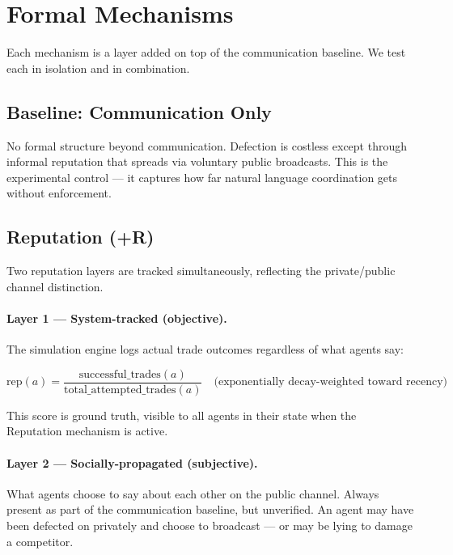 \documentclass[12pt, a4paper]{article}
\begin{document}
\section{Formal Mechanisms}
\label{sec:mechanisms}

Each mechanism is a layer added on top of the communication baseline. We test each in isolation and in combination.

\subsection{Baseline: Communication Only}

No formal structure beyond communication. Defection is costless except through informal reputation that spreads via voluntary public broadcasts. This is the experimental control — it captures how far natural language coordination gets without enforcement.

\subsection{Reputation (+R)}

Two reputation layers are tracked simultaneously, reflecting the private/public channel distinction.

\paragraph{Layer 1 — System-tracked (objective).}

The simulation engine logs actual trade outcomes regardless of what agents say:

\[
\text{rep}(a) = \frac{\text{successful\_trades}(a)}{\text{total\_attempted\_trades}(a)} \quad \text{(exponentially decay-weighted toward recency)}
\]

This score is ground truth, visible to all agents in their state when the Reputation mechanism is active.

\paragraph{Layer 2 — Socially-propagated (subjective).}

What agents choose to say about each other on the public channel. Always present as part of the communication baseline, but unverified. An agent may have been defected on privately and choose to broadcast — or may be lying to damage a competitor.
\end{document}
